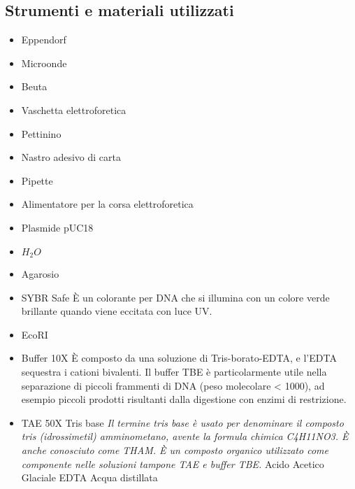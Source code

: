 \documentclass{extarticle}
\begin{document}
\subsection*{Strumenti e materiali utilizzati}
\begin{minipage}{0.5\textwidth}
    \begin{itemize}
        \item Eppendorf
        \item Microonde
        \item Beuta
        \item Vaschetta elettroforetica
        \item Pettinino
        \item Nastro adesivo di carta
        \item Pipette
        \item Alimentatore per la corsa elettroforetica
        \item Plasmide pUC18
        \item $H_2O$
        \item Agarosio
        \item SYBR Safe
        \subitem È un colorante per DNA che si illumina con un colore verde brillante quando viene eccitata con luce UV.
    \end{itemize}
\end{minipage} \hfill
\begin{minipage}{0.50\textwidth} 
    \begin{itemize}
        \item EcoRI
        \item Buffer 10X
        \subitem È composto da una soluzione di Tris-borato-EDTA, e l'EDTA sequestra i cationi bivalenti. Il buffer TBE è particolarmente utile nella separazione di piccoli frammenti di DNA (peso molecolare < 1000), ad esempio piccoli prodotti risultanti dalla digestione con enzimi di restrizione.
        \item TAE 50X
        \subitem{-} Tris base
        \subsubitem \textit{Il termine tris base è usato per denominare il composto tris (idrossimetil) amminometano, avente la formula chimica C4H11NO3. È anche conosciuto come THAM. È un composto organico utilizzato come componente nelle soluzioni tampone TAE e buffer TBE.}
        \subitem{-} Acido Acetico Glaciale
        \subitem{-} EDTA
        \subitem{-} Acqua distillata
    \end{itemize}
\end{minipage}
\end{document}
